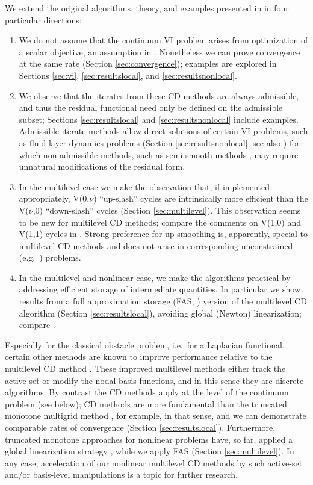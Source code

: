 \documentclass[letterpaper,final,12pt,reqno]{amsart}
\theoremstyle{cstyle}
\theoremstyle{dstyle}
\numberwithin{equation}{section}
\numberwithin{figure}{section}
\numberwithin{table}{section}
\numberwithin{theorem}{section}
\begin{document}
We extend the original algorithms, theory, and examples presented in \cite{Tai2003} in four particular directions:
\renewcommand{\labelenumi}{\emph{(\roman{enumi})}}
\begin{enumerate}
\item We do not assume that the continuum VI problem arises from optimization of a scalar objective, an assumption in \cite{Tai2003}.  Nonetheless we can prove convergence at the same rate (Section \ref{sec:convergence}); %
examples are explored in Sections \ref{sec:vi}, \ref{sec:resultslocal}, and \ref{sec:resultsnonlocal}.
\item We observe that the iterates from these CD methods are always admissible, and thus the residual functional need only be defined on the admissible subset; Sections \ref{sec:resultslocal} and \ref{sec:resultsnonlocal} include examples.  Admissible-iterate methods allow direct solutions of certain VI problems, such as fluid-layer dynamics problems (Section \ref{sec:resultsnonlocal}; see also \cite{Bueler2021conservation,JouvetBueler2012}) for which non-admissible methods, such as semi-smooth methods \cite{BensonMunson2006}, may require unnatural modifications of the residual form.
\item In the multilevel case we make the observation that, if implemented appropriately, V(0,$\nu$) ``up-slash'' cycles are intrinsically more efficient than the V($\nu$,0) ``down-slash'' cycles (Section \ref{sec:multilevel}).  This observation seems to be new for multilevel CD methods; compare the comments on V(1,0) and V(1,1) cycles in \cite{GraeserKornhuber2009,Tai2003}.  Strong preference for up-smoothing is, apparently, special to multilevel CD methods and does not arise in corresponding unconstrained (e.g.~\cite{Xu1992}) problems.
\item In the multilevel and nonlinear case, we make the algorithms practical by addressing efficient storage of intermediate quantities.  In particular we show results from a full approximation storage (FAS; \cite{Brandt1977}) version of the multilevel CD algorithm (Section \ref{sec:resultslocal}), avoiding global (Newton) linearization; compare \cite{GraeserKornhuber2009}.
\end{enumerate}

Especially for the classical obstacle problem, i.e.~for a Laplacian functional, certain other methods are known to improve performance relative to the multilevel CD method \cite{GraeserKornhuber2009}.  These improved multilevel methods either track the active set or modify the nodal basis functions, and in this sense they are discrete algorithms.  By contrast the CD methods apply at the level of the continuum problem (see below); CD methods are more fundamental than the truncated monotone multigrid method \cite{Kornhuber1994}, for example, in that sense, and we can demonstrate comparable rates of convergence (Section \ref{sec:resultslocal}). %
Furthermore, truncated monotone approaches for nonlinear problems have, so far, applied a global linearization strategy \cite{GraeserKornhuber2009}, while we apply FAS (Section \ref{sec:multilevel}).  In any case, acceleration of our nonlinear multilevel CD methods by such active-set and/or basis-level manipulations is a topic for further research.
\end{document}
